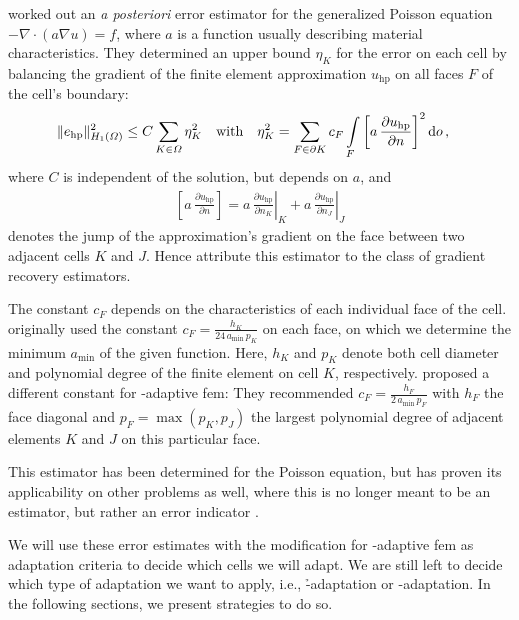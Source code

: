 \textcite{kelly1983} worked out an \textit{a posteriori} error estimator for the generalized Poisson equation $-\nabla \cdot \left( a \nabla u \right) = f$, where $a$ is a function usually describing material characteristics. They determined an upper bound $\eta_K$ for the error on each cell by balancing the gradient of the finite element approximation $u_\text{hp}$ on all faces $F$ of the cell's boundary:
\begin{align}
\label{eq:kelly} \|e_\text{hp}\|_{H_1(\Omega)}^2 &\leq C \sum\limits_{K \in \Omega} \eta_K^2 &&\text{with}&  \eta_K^2 &= \sum\limits_{F \in \partial K} c_F \int\limits_{F} \left[ a \, \frac{\partial u_\text{hp}}{\partial n} \right]^2 \mathop{}\!\mathrm{d}o \,\text{,}
\end{align}
where $C$ is independent of the solution, but depends on $a$, and
\begin{align}
\left[ a \, \frac{\partial u_\text{hp}}{\partial n} \right] = \left. a \, \frac{\partial u_\text{hp}}{\partial n_K} \right|_K + \left. a \, \frac{\partial u_\text{hp}}{\partial n_J}\right|_J
\end{align}
denotes the jump of the approximation's gradient on the face between two adjacent cells $K$ and $J$. Hence \textcite{ainsworth1997a} attribute this estimator to the class of gradient recovery estimators.

The constant $c_F$ depends on the characteristics of each individual face of the cell. \textcite{kelly1983} originally used the constant $c_F = \frac{h_K}{24 \, a_\text{min} \, p_K}$ on each face, on which we determine the minimum $a_\text{min}$ of the given function. Here, $h_K$ and $p_K$ denote both cell diameter and polynomial degree of the finite element on cell $K$, respectively. \textcite{davydov2017} proposed a different constant for \hp-adaptive \gls{fem}: They recommended $c_F = \frac{h_F}{2 \, a_\text{min} \, p_F}$ with $h_F$ the face diagonal and $p_F = \max\left(p_K, p_J\right)$ the largest polynomial degree of adjacent elements $K$ and $J$ on this particular face.

This estimator has been determined for the Poisson equation, but has proven its applicability on other problems as well, where this is no longer meant to be an estimator, but rather an error indicator \cite{dealiikelly}.

We will use these error estimates with the modification for \hp-adaptive \gls{fem} as adaptation criteria to decide which cells we will adapt. We are still left to decide which type of adaptation we want to apply, i.e., \h-adaptation or \p-adaptation. In the following sections, we present strategies to do so.



